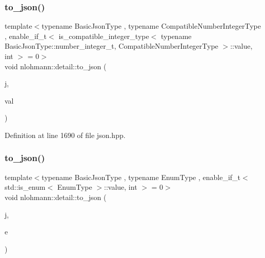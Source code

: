 \mbox{\label{namespacenlohmann_1_1detail_a91fe576be579c8c2fdd14610605c6dd2}} 
\subsubsection{\texorpdfstring{to\+\_\+json()}{to\_json()}\hspace{0.1cm}{\footnotesize\ttfamily [6/16]}}
{\footnotesize\ttfamily template$<$typename Basic\+Json\+Type , typename Compatible\+Number\+Integer\+Type , enable\+\_\+if\+\_\+t$<$ is\+\_\+compatible\+\_\+integer\+\_\+type$<$ typename Basic\+Json\+Type\+::number\+\_\+integer\+\_\+t, Compatible\+Number\+Integer\+Type $>$\+::value, int $>$  = 0$>$ \\
void nlohmann\+::detail\+::to\+\_\+json (\begin{DoxyParamCaption}\item[{Basic\+Json\+Type \&}]{j,  }\item[{Compatible\+Number\+Integer\+Type}]{val }\end{DoxyParamCaption})\hspace{0.3cm}{\ttfamily [noexcept]}}



Definition at line 1690 of file json.\+hpp.

\mbox{\label{namespacenlohmann_1_1detail_a0c8b159dba71981d6c555d284cf6e2bf}} 
\subsubsection{\texorpdfstring{to\+\_\+json()}{to\_json()}\hspace{0.1cm}{\footnotesize\ttfamily [7/16]}}
{\footnotesize\ttfamily template$<$typename Basic\+Json\+Type , typename Enum\+Type , enable\+\_\+if\+\_\+t$<$ std\+::is\+\_\+enum$<$ Enum\+Type $>$\+::value, int $>$  = 0$>$ \\
void nlohmann\+::detail\+::to\+\_\+json (\begin{DoxyParamCaption}\item[{Basic\+Json\+Type \&}]{j,  }\item[{Enum\+Type}]{e }\end{DoxyParamCaption})\hspace{0.3cm}{\ttfamily [noexcept]}}



